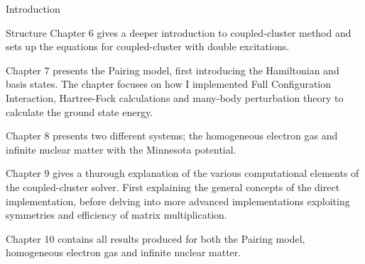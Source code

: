 \documentclass[twoside,english]{uiofysmaster}
\begin{document}
\begin{chapter}{Introduction}
\begin{subsection}{Structure}
		Chapter 6 gives a deeper introduction to coupled-cluster method and sets up the equations for coupled-cluster with double excitations. 

		Chapter 7 presents the Pairing model, first introducing the Hamiltonian and basis states. The chapter focuses on how I implemented Full Configuration Interaction, Hartree-Fock calculations and many-body perturbation theory to calculate the ground state energy. 

		Chapter 8 presents two different systems; the homogeneous electron gas and infinite nuclear matter with the Minnesota potential. 

		Chapter 9 gives a thurough explanation of the various computational elements of the coupled-cluster solver. First explaining the general concepts of the direct implementation, before delving into more advanced implementations exploiting symmetries and efficiency of matrix multiplication. 

		Chapter 10 contains all results produced for both the Pairing model, homogeneous electron gas and infinite nuclear matter. 
	\end{subsection}
\end{chapter}
\end{document}
